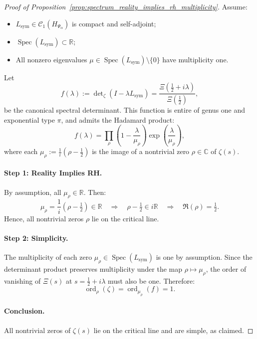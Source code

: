 \begin{proof}[Proof of Proposition~\ref{prop:spectrum_reality_implies_rh_multiplicity}]
Assume:
\begin{itemize}
  \item \( L_{\mathrm{sym}} \in \mathcal{C}_1(H_{\Psi_\alpha}) \) is compact and self-adjoint;
  \item \( \operatorname{Spec}(L_{\mathrm{sym}}) \subset \mathbb{R} \);
  \item All nonzero eigenvalues \( \mu \in \operatorname{Spec}(L_{\mathrm{sym}}) \setminus \{0\} \) have multiplicity one.
\end{itemize}

Let
\[
f(\lambda) := \det\nolimits_\zeta(I - \lambda L_{\mathrm{sym}}) = \frac{\Xi\left(\tfrac{1}{2} + i\lambda\right)}{\Xi\left(\tfrac{1}{2}\right)},
\]
be the canonical spectral determinant. This function is entire of genus one and exponential type \( \pi \), and admits the Hadamard product:
\[
f(\lambda) = \prod_{\rho} \left(1 - \frac{\lambda}{\mu_\rho}\right) \exp\left( \frac{\lambda}{\mu_\rho} \right),
\]
where each \( \mu_\rho := \frac{1}{i}(\rho - \tfrac{1}{2}) \) is the image of a nontrivial zero \( \rho \in \mathbb{C} \) of \( \zeta(s) \).

\paragraph{Step 1: Reality Implies RH.}
By assumption, all \( \mu_\rho \in \mathbb{R} \). Then:
\[
\mu_\rho = \frac{1}{i}(\rho - \tfrac{1}{2}) \in \mathbb{R} \quad \Longrightarrow \quad \rho - \tfrac{1}{2} \in i\mathbb{R} \quad \Longrightarrow \quad \Re(\rho) = \tfrac{1}{2}.
\]
Hence, all nontrivial zeros \( \rho \) lie on the critical line.

\paragraph{Step 2: Simplicity.}
The multiplicity of each zero \( \mu_\rho \in \operatorname{Spec}(L_{\mathrm{sym}}) \) is one by assumption. Since the determinant product preserves multiplicity under the map \( \rho \mapsto \mu_\rho \), the order of vanishing of \( \Xi(s) \) at \( s = \tfrac{1}{2} + i\lambda \) must also be one. Therefore:
\[
\operatorname{ord}_\rho(\zeta) = \operatorname{ord}_{\mu_\rho}(f) = 1.
\]

\paragraph{Conclusion.}
All nontrivial zeros of \( \zeta(s) \) lie on the critical line and are simple, as claimed.
\end{proof}
